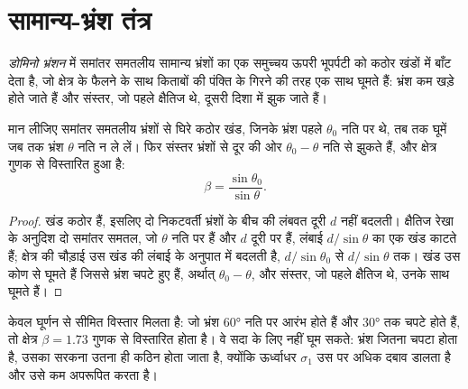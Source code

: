 \begin{omfigure}
\par{}\label{fig:b3:extension-strike-slip:models}
\end{omfigure}

\section{सामान्य-भ्रंश तंत्र}\label{sec:b3:extension-strike-slip:faults}

\begin{definition}[डोमिनो भ्रंशन]\label{def:b3:extension-strike-slip:domino}
\emph{डोमिनो भ्रंशन} में समांतर समतलीय सामान्य भ्रंशों का एक समुच्चय ऊपरी भूपर्पटी को
कठोर खंडों में बाँट देता है, जो क्षेत्र के फैलने के साथ किताबों की
पंक्ति के गिरने की तरह एक साथ घूमते हैं: भ्रंश कम खड़े होते जाते हैं और
संस्तर, जो पहले क्षैतिज थे, दूसरी दिशा में झुक जाते हैं।
\end{definition}

\begin{theorem}[डोमिनो द्वारा प्रसार]\label{thm:b3:extension-strike-slip:domino}
मान लीजिए समांतर समतलीय भ्रंशों से घिरे कठोर खंड, जिनके भ्रंश पहले $\theta_0$ नति पर थे,
तब तक घूमें जब तक भ्रंश $\theta$ नति न ले लें। फिर संस्तर भ्रंशों से दूर की ओर $\theta_0
- \theta$ नति से झुकते हैं, और क्षेत्र
गुणक से विस्तारित हुआ है:
\[
  \beta = \frac{\sin\theta_0}{\sin\theta} .
\]
\end{theorem}

\begin{proof}
खंड कठोर हैं, इसलिए दो निकटवर्ती भ्रंशों के बीच की लंबवत दूरी $d$
नहीं बदलती। क्षैतिज रेखा के अनुदिश दो समांतर
समतल, जो $\theta$ नति पर हैं और $d$ दूरी पर हैं, लंबाई $d/\sin
\theta$ का एक खंड काटते हैं; क्षेत्र की चौड़ाई उस खंड की लंबाई के अनुपात में बदलती है,
$d/\sin\theta_0$ से $d/\sin\theta$ तक। खंड उस कोण से घूमते हैं जिससे भ्रंश चपटे हुए हैं,
अर्थात् $\theta_0 - \theta$, और संस्तर, जो पहले क्षैतिज थे,
उनके साथ घूमते हैं।
\end{proof}

केवल घूर्णन से सीमित विस्तार मिलता है: जो भ्रंश \ang{60} नति पर आरंभ होते हैं और
\ang{30} तक चपटे होते हैं, तो क्षेत्र $\beta = 1.73$ गुणक से विस्तारित होता है। वे
सदा के लिए नहीं घूम सकते: भ्रंश जितना चपटा होता है, उसका सरकना उतना ही कठिन होता जाता है, क्योंकि ऊर्ध्वाधर
$\sigma_1$ उस पर अधिक दबाव डालता है और उसे कम अपरूपित करता है।

